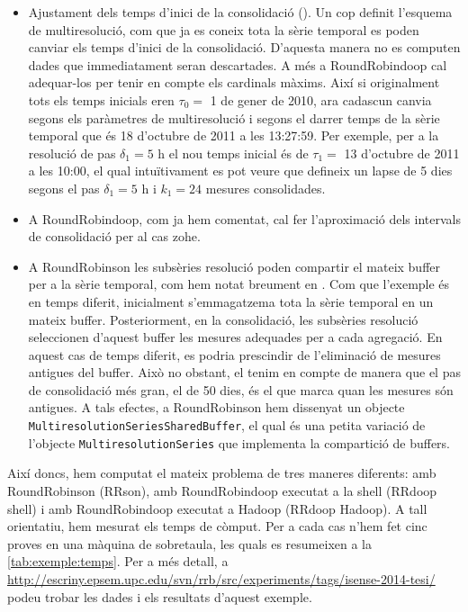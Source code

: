 \begin{itemize}
\item Ajustament dels temps d'inici de la consolidació
  (). Un cop definit l'esquema
  de multiresolució, com que ja es coneix tota la sèrie temporal es
  poden canviar els temps d'inici de la consolidació. D'aquesta manera
  no es computen dades que immediatament seran descartades. A més a
  RoundRobindoop cal adequar-los per tenir en compte els cardinals
  màxims. Així si originalment tots els temps inicials eren $\tau_0=$
  1 de gener de 2010, ara cadascun canvia segons els paràmetres de
  multiresolució i segons el darrer temps de la sèrie temporal que és
  18 d'octubre de 2011 a les 13:27:59. Per exemple, per a la resolució
  de pas $\delta_1=5 \text{ h}$ el nou temps inicial és de $\tau_1=$
  13 d'octubre de 2011 a les 10:00, el qual intuïtivament es pot veure
  que defineix un lapse de 5 dies segons el pas $\delta_1=5 \text{ h}$
  i $k_1=24$ mesures consolidades.


\item A RoundRobindoop, com ja hem comentat, cal fer l'aproximació
  dels intervals de consolidació per al cas \gls{zohe}.


\item A RoundRobinson les subsèries resolució poden compartir el
  mateix buffer per a la sèrie temporal, com hem notat breument en
  . Com que l'exemple és
  en temps diferit, inicialment s'emmagatzema tota la sèrie temporal
  en un mateix buffer. Posteriorment, en la consolidació, les
  subsèries resolució seleccionen d'aquest buffer les mesures
  adequades per a cada agregació. En aquest cas de temps diferit, es
  podria prescindir de l'eliminació de mesures antigues del
  buffer. Això no obstant, el tenim en compte de manera que el pas de
  consolidació més gran, el de 50 dies, és el que marca quan les
  mesures són antigues. A tals efectes, a RoundRobinson hem dissenyat
  un objecte \lstinline[style=py]+MultiresolutionSeriesSharedBuffer+,
  el qual és una petita variació de l'objecte
  \lstinline[style=py]+MultiresolutionSeries+ que implementa la
  compartició de buffers.

\end{itemize}




Així doncs, hem computat el mateix problema de tres maneres diferents:
amb RoundRobinson (RRson), amb RoundRobindoop executat a la shell
(RRdoop shell) i amb RoundRobindoop executat a Hadoop (RRdoop
Hadoop). A tall orientatiu, hem mesurat els temps de còmput. Per a cada
cas n'hem fet cinc proves en una màquina de sobretaula, les
quals es resumeixen a la \autoref{tab:exemple:temps}. 
%
Per a més detall, a
\url{http://escriny.epsem.upc.edu/svn/rrb/src/experiments/tags/isense-2014-tesi/}
podeu trobar les dades i els resultats d'aquest exemple.


